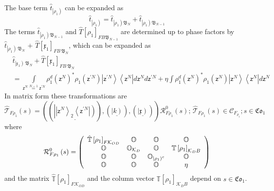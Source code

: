 \documentclass[aps,preprint]{revtex4}%
\begin{document}
The base term $\hat{t}_{\left\vert \rho_{1}\right)  }$ can be expanded as
\begin{equation}
\hat{t}_{\left\vert \rho_{1}\right)  }=\hat{t}_{\left\vert \rho_{1}\right)
\mathfrak{B}_{N}}+\hat{t}_{\left\vert \rho_{1}\right)  \mathfrak{B}_{N-1}}%
\end{equation}
The terms $\hat{t}_{\left\vert \rho_{1}\right)  \mathfrak{B}_{N-1}}$ and
$\hat{T}\left[  \rho_{1}\right]  _{FB\mathfrak{B}_{N-1}}$ are determined up to
phase factors by $\hat{t}_{\left\vert \rho_{1}\right)  \,\mathfrak{B}_{N}}$
$+$ $\hat{T}\left[  \mathfrak{x}_{1}\right]  _{FB\,\mathfrak{B}_{N}}$, which
can be expanded as
\begin{align}
&  \hat{t}_{\left\vert \mathfrak{x}_{1}\right)  \,\mathfrak{B}_{N}}+\hat
{T}\left[  \mathfrak{x}_{1}\right]  _{FB\,\mathfrak{B}_{N}}\nonumber\\
&  =%
{\displaystyle\int\limits_{\mathsf{z}^{N}\overset{N-1}{\,=\,}\mathsf{z}%
^{\prime N}}}
\mathfrak{\rho}_{1}^{d}\left(  \mathsf{z}^{N}\right)  ^{\ast}\mathfrak{\rho
}_{1}\left(  \mathsf{z}^{\prime N}\right)  \left\vert \mathsf{z}^{\prime
N}\right\rangle \left\langle \mathsf{z}^{N}\right\vert d\mathsf{z}%
^{N}d\mathsf{z}^{\prime N}+\eta%
{\displaystyle\int}
\mathfrak{\rho}_{1}^{d}\left(  \mathsf{z}^{N}\right)  ^{\ast}\mathfrak{\rho
}_{1}\left(  \mathsf{z}^{N}\right)  \left\vert \mathsf{z}^{N}\right\rangle
\left\langle \mathsf{z}^{N}\right\vert d\mathsf{z}^{N}%
\end{align}
In matrix form these transformations are%
\begin{equation}
\mathcal{\hat{T}}_{F\rho_{1}}\left(  s\right)  =\left(  \left(  \underline
{\left\vert \left\vert \mathsf{z}^{N}\right\rangle _{2}\left\langle
\mathsf{z}^{\prime N}\right\vert \right)  }\right)  ,\left(  \underline
{\left\vert k\right)  }\right)  ,\left(  \underline{\left\vert \mathfrak{x}%
\right)  }\right)  \right)  \mathcal{R}_{F\rho_{1}}^{0}\left(  s\right)
;\,\mathcal{\hat{T}}_{F\rho_{1}}\left(  s\right)  \in\mathcal{C}_{F_{\rho_{1}%
}};s\in\mathfrak{Co}_{1}%
\end{equation}
where
\begin{equation}
\mathcal{R}_{F\rho_{1}}^{0}\left(  s\right)  =\left(
\begin{array}
[c]{cccc}%
\mathbb{\hat{T}}\left[  \rho_{1}\right]  _{F\mathcal{K}_{OD}} & \mathbb{O} &
\mathbb{O} & \mathbb{O}\\
\mathbb{O} & \mathbb{O}_{\mathcal{K}_{D}} & \mathbb{O} & \mathbb{T}\left[
\rho_{1}\right]  _{\mathcal{K}_{D}B}\\
\mathbb{O} & \mathbb{O} & \mathbb{O}_{\left\vert \mathfrak{\rho}_{1}\right)
^{c}} & \mathbb{O}\\
\mathbb{O} & \mathbb{O} & \mathbb{O} & \eta
\end{array}
\right)
\end{equation}
and the matrix $\mathbb{\hat{T}}\left[  \rho_{1}\right]  _{F\mathcal{K}_{OD}}$
and the column vector $\mathbb{T}\left[  \rho_{1}\right]  _{\mathcal{K}_{D}B}$
depend on $s\in\mathfrak{Co}_{1}$.
\end{document}
